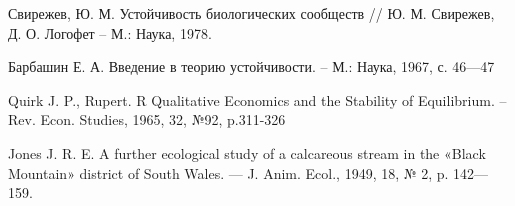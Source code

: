 \begin{thebibliography}{9}
        Свирежев, Ю. М. Устойчивость биологических сообществ // Ю. М. Свирежев, Д. О. Логофет -- М.: Наука, 1978.

        Барбашин Е. А. Введение в теорию устойчивости. -- М.: Наука, 1967, с. 46—47
    
        Quirk J. P., Rupert. R Qualitative Economics and the Stability of Equilibrium. -- Rev. Econ. Studies, 1965, 32, №92, p.311-326

        Jones J. R. E. A further ecological study of a calcareous stream in the «Black Mountain» district of South Wales. — J. Anim. Ecol., 1949, 18, № 2, p. 142—159.


\end{thebibliography}
